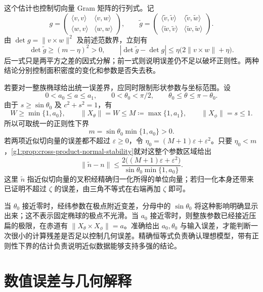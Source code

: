 这个估计也控制切向量 Gram 矩阵的行列式。记
\[
	g=\begin{pmatrix}\langle v,v\rangle&\langle v,w\rangle\\
	\langle w,v\rangle&\langle w,w\rangle\end{pmatrix},
	\qquad \widetilde g=\begin{pmatrix}\langle\widetilde v,\widetilde v\rangle&\langle\widetilde v,\widetilde w\rangle\\
	\langle\widetilde w,\widetilde v\rangle&\langle\widetilde w,\widetilde w\rangle\end{pmatrix}.
\]
由 \(\det g=\lVert v\times w\rVert^2\) 及前述范数界，立刻有
\[
	\det\widetilde g\ge(m-\eta)^2>0,\qquad
	|\det\widetilde g-\det g|
	\le\eta\bigl(2\lVert v\times w\rVert+\eta\bigr).
\]
后一式只是两平方之差的因式分解；前一式则说明误差仍不足以破坏正则性。两种结论分别控制面积密度的变化和参数是否失去秩。

\ProseParagraphBreak

若要对一整族椭球给出统一误差界，应同时限制形状参数与坐标范围。设
\[
	0<a_0\le a\le a_1,\qquad
	0<\theta_0<\pi/2,\qquad\theta_0\le\theta\le\pi-\theta_0.
\]
由于 \(s\ge\sin\theta_0\) 及 \(c^2+s^2=1\)，有
\[
	W\ge\min\{1,a_0\},\qquad
	\lVert X_\theta\rVert=W\le M\coloneqq\max\{1,a_1\},\qquad
	\lVert X_\phi\rVert=s\le1.
\]
所以可取统一的正则性下界
\[
	m=\sin\theta_0\min\{1,a_0\}>0.
\]
若两项近似切向量的误差都不超过 \(\varepsilon\ge0\)，令 \(\eta_0=(M+1)\varepsilon+\varepsilon^2\)。只要 \(\eta_0<m\)，\cref{g1:prop:cross-product-normal-stability}就对这整个参数区域给出
\begin{equation}\label{g1:eq:ellipsoid-uniform-normal-bound}
	\lVert\widetilde n-n\rVert
	\le\frac{2\bigl((M+1)\varepsilon+\varepsilon^2\bigr)}
	{\sin\theta_0\min\{1,a_0\}}.
\end{equation}
这里 \(\widetilde n\) 指近似切向量的叉积经精确归一化所得的单位向量；若归一化本身还带来已证明不超过 \(\zeta\) 的误差，由三角不等式在右端再加 \(\zeta\) 即可。

\ProseParagraphBreak

当 \(\theta_0\) 接近零时，经纬参数在极点附近变差，分母中的 \(\sin\theta_0\) 将这种影响明确显示出来；这不表示固定椭球的极点不光滑。当 \(a_0\) 接近零时，则整族参数已经接近压扁的极限，在赤道有 \(\lVert X_\theta\times X_\phi\rVert=a\)。准确给出 \(a_0,\theta_0\) 与输入误差，才能判断一次很小的计算残差是否足以控制几何误差。精确恒等式负责确认理想模型，带有正则性下界的估计负责说明近似数据能够支持多强的结论。

\section{数值误差与几何解释}
\label{g1:sec:C02}

